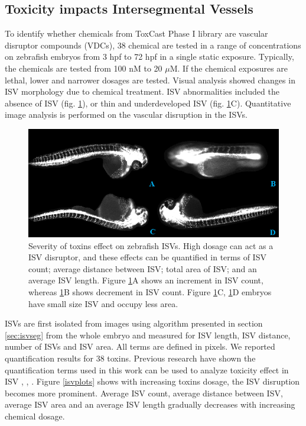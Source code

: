 \subsection{Toxicity impacts Intersegmental Vessels}

To identify whether chemicals from ToxCast Phase I library are vascular disruptor compounds (VDCs), 38 chemical are tested in a range of concentrations on zebrafish embryos from 3 hpf to 72 hpf in a single static exposure. Typically, the chemicals are tested from 100 nM to 20 $\mu$M. If the chemical exposures are lethal, lower and narrower dosages are tested. Visual analysis showed changes in ISV morphology due to chemical treatment. ISV abnormalities included the absence of ISV (fig. \ref{toxicity}), or thin and underdeveloped ISV (fig. \ref{toxicity}C). Quantitative image analysis is performed on the vascular disruption in the ISVs. 

\begin{figure}[H]\centering
  \begin{center}
    \includegraphics[scale=0.35]{figure/toxicityEffect.png}
  \end{center}
  \caption[Effect of toxins on ISV]{ Severity of toxins effect on zebrafish ISVs. High dosage can act as a ISV disruptor, and these effects can be quantified in terms of ISV count; average distance between ISV; total area of ISV; and an average ISV length. Figure \ref{toxicity}A shows an increment in ISV count, whereas \ref{toxicity}B shows decrement in ISV count.  Figure \ref{toxicity}C, \ref{toxicity}D embryos have small size ISV and occupy less area.}
  \label{toxicity}
\end{figure}


ISVs are first isolated from images using algorithm presented in section \ref{sec:isvseg} from the whole embryo and measured for ISV length, ISV distance, number of ISVs and ISV area. All terms are defined in pixels. We reported quantification results for 38 toxins. Previous research have shown the quantification terms used in this work can be used to analyze toxicity effect in ISV \cite{Feng05}, \cite{Tran07}, \cite{Vogt09}. Figure \ref{isvplots} shows with increasing toxins dosage, the ISV disruption becomes more prominent. Average ISV count, average distance between ISV, average ISV area and an average ISV length gradually decreases with increasing chemical dosage. %

